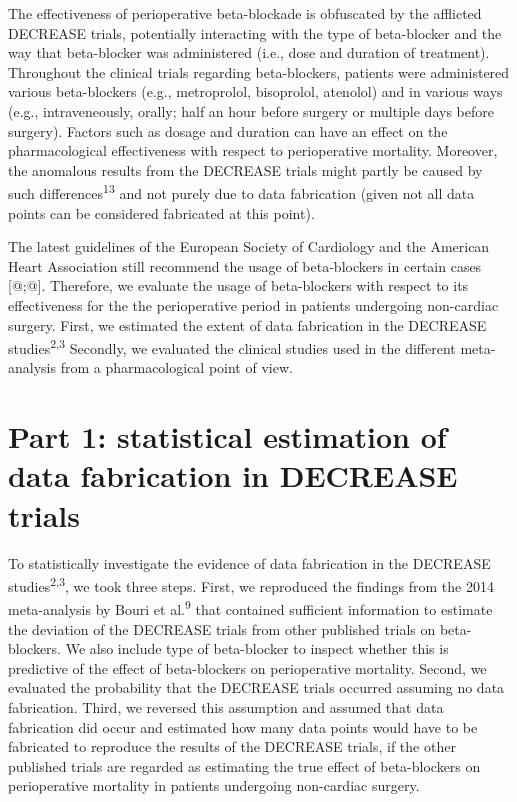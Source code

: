 \documentclass[]{article}
\begin{document}
The effectiveness of perioperative beta-blockade is obfuscated by the
afflicted DECREASE trials, potentially interacting with the type of
beta-blocker and the way that beta-blocker was administered (i.e., dose
and duration of treatment). Throughout the clinical trials regarding
beta-blockers, patients were administered various beta-blockers (e.g.,
metroprolol, bisoprolol, atenolol) and in various ways (e.g.,
intraveneously, orally; half an hour before surgery or multiple days
before surgery). Factors such as dosage and duration can have an effect
on the pharmacological effectiveness with respect to perioperative
mortality. Moreover, the anomalous results from the DECREASE trials
might partly be caused by such differences\textsuperscript{13} and not
purely due to data fabrication (given not all data points can be
considered fabricated at this point).

The latest guidelines of the European Society of Cardiology and the
American Heart Association still recommend the usage of beta-blockers in
certain cases {[}@;@{]}. Therefore, we evaluate the usage of
beta-blockers with respect to its effectiveness for the the
perioperative period in patients undergoing non-cardiac surgery. First,
we estimated the extent of data fabrication in the DECREASE
studies\textsuperscript{2,3} Secondly, we evaluated the clinical studies
used in the different meta-analysis from a pharmacological point of
view.

\section{Part 1: statistical estimation of data fabrication in DECREASE
trials}\label{part-1-statistical-estimation-of-data-fabrication-in-decrease-trials}

To statistically investigate the evidence of data fabrication in the
DECREASE studies\textsuperscript{2,3}, we took three steps. First, we
reproduced the findings from the 2014 meta-analysis by Bouri et
al.\textsuperscript{9} that contained sufficient information to estimate
the deviation of the DECREASE trials from other published trials on
beta-blockers. We also include type of beta-blocker to inspect whether
this is predictive of the effect of beta-blockers on perioperative
mortality. Second, we evaluated the probability that the DECREASE trials
occurred assuming no data fabrication. Third, we reversed this
assumption and assumed that data fabrication did occur and estimated how
many data points would have to be fabricated to reproduce the results of
the DECREASE trials, if the other published trials are regarded as
estimating the true effect of beta-blockers on perioperative mortality
in patients undergoing non-cardiac surgery.
\end{document}

